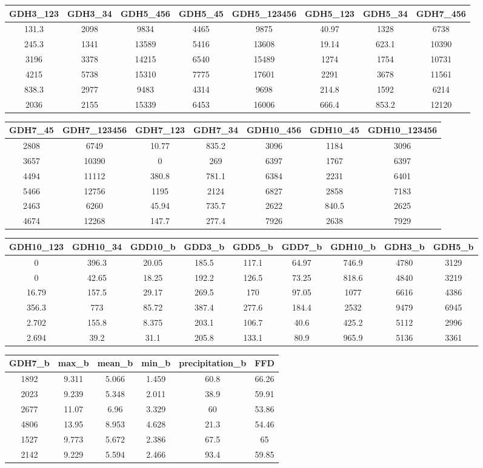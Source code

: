 \documentclass[10pt,]{article}
\begin{document}
\begin{longtable}[]{@{}cccccccc@{}}
\toprule
GDH3\_123 & GDH3\_34 & GDH5\_456 & GDH5\_45 & GDH5\_123456 & GDH5\_123 &
GDH5\_34 & GDH7\_456\tabularnewline
\midrule
\endhead
131.3 & 2098 & 9834 & 4465 & 9875 & 40.97 & 1328 & 6738\tabularnewline
245.3 & 1341 & 13589 & 5416 & 13608 & 19.14 & 623.1 &
10390\tabularnewline
3196 & 3378 & 14215 & 6540 & 15489 & 1274 & 1754 & 10731\tabularnewline
4215 & 5738 & 15310 & 7775 & 17601 & 2291 & 3678 & 11561\tabularnewline
838.3 & 2977 & 9483 & 4314 & 9698 & 214.8 & 1592 & 6214\tabularnewline
2036 & 2155 & 15339 & 6453 & 16006 & 666.4 & 853.2 &
12120\tabularnewline
\bottomrule
\end{longtable}

\begin{longtable}[]{@{}ccccccc@{}}
\toprule
GDH7\_45 & GDH7\_123456 & GDH7\_123 & GDH7\_34 & GDH10\_456 & GDH10\_45
& GDH10\_123456\tabularnewline
\midrule
\endhead
2808 & 6749 & 10.77 & 835.2 & 3096 & 1184 & 3096\tabularnewline
3657 & 10390 & 0 & 269 & 6397 & 1767 & 6397\tabularnewline
4494 & 11112 & 380.8 & 781.1 & 6384 & 2231 & 6401\tabularnewline
5466 & 12756 & 1195 & 2124 & 6827 & 2858 & 7183\tabularnewline
2463 & 6260 & 45.94 & 735.7 & 2622 & 840.5 & 2625\tabularnewline
4674 & 12268 & 147.7 & 277.4 & 7926 & 2638 & 7929\tabularnewline
\bottomrule
\end{longtable}

\begin{longtable}[]{@{}ccccccccc@{}}
\toprule
GDH10\_123 & GDH10\_34 & GDD10\_b & GDD3\_b & GDD5\_b & GDD7\_b &
GDH10\_b & GDH3\_b & GDH5\_b\tabularnewline
\midrule
\endhead
0 & 396.3 & 20.05 & 185.5 & 117.1 & 64.97 & 746.9 & 4780 &
3129\tabularnewline
0 & 42.65 & 18.25 & 192.2 & 126.5 & 73.25 & 818.6 & 4840 &
3219\tabularnewline
16.79 & 157.5 & 29.17 & 269.5 & 170 & 97.05 & 1077 & 6616 &
4386\tabularnewline
356.3 & 773 & 85.72 & 387.4 & 277.6 & 184.4 & 2532 & 9479 &
6945\tabularnewline
2.702 & 155.8 & 8.375 & 203.1 & 106.7 & 40.6 & 425.2 & 5112 &
2996\tabularnewline
2.694 & 39.2 & 31.1 & 205.8 & 133.1 & 80.9 & 965.9 & 5136 &
3361\tabularnewline
\bottomrule
\end{longtable}

\begin{longtable}[]{@{}cccccc@{}}
\toprule
GDH7\_b & max\_b & mean\_b & min\_b & precipitation\_b &
FFD\tabularnewline
\midrule
\endhead
1892 & 9.311 & 5.066 & 1.459 & 60.8 & 66.26\tabularnewline
2023 & 9.239 & 5.348 & 2.011 & 38.9 & 59.91\tabularnewline
2677 & 11.07 & 6.96 & 3.329 & 60 & 53.86\tabularnewline
4806 & 13.95 & 8.953 & 4.628 & 21.3 & 54.46\tabularnewline
1527 & 9.773 & 5.672 & 2.386 & 67.5 & 65\tabularnewline
2142 & 9.229 & 5.594 & 2.466 & 93.4 & 59.85\tabularnewline
\bottomrule
\end{longtable}
\end{document}
